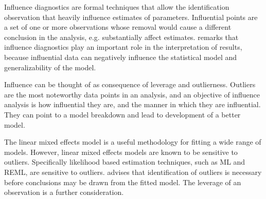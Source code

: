 \documentclass[12pt, a4paper]{report}
\theoremstyle{plain}
\theoremstyle{definition}
\theoremstyle{remark}
\begin{document}
	
Influence diagnostics are formal techniques that allow the identification observation that heavily influence estimates of parameters.
Influential points are a set of one or more observations whose removal would cause a different conclusion in the analysis, e.g. substantially affect estimates. \citet{west} remarks that influence diagnostics play an important role in the interpretation of results, because influential data can negatively influence the statistical model and generalizability of the model.


	
	
Influence can be thought of as consequence of leverage and outlierness. Outliers are the most noteworthy data points in an analysis, and an objective of influence analysis is how influential they are, and the manner in which they are influential. They can point to a model breakdown and lead to development of a better model.

The linear mixed effects model is a useful methodology for fitting a wide range of models. However, linear mixed effects models are known to be sensitive to outliers. Specifically likelihood based estimation techniques, such as ML and REML, are sensitive to outliers. \citet{Christensen} advises that identification of outliers is necessary before conclusions may be drawn from the fitted model. The leverage of an observation is a further consideration. 
	


	
%
%	
	
\end{document}

